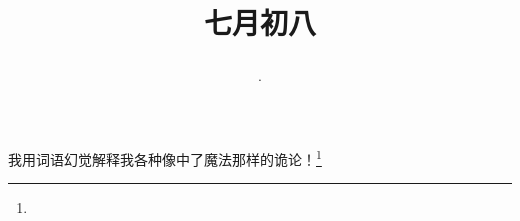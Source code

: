 \title{\date[d=11,m=8,y=2024][year:cn-y,年,month:cn,day:cn,日,·,weekday]·七月初八 }
我用词语幻觉解释我各种像中了魔法那样的诡论！\footnote{ }

